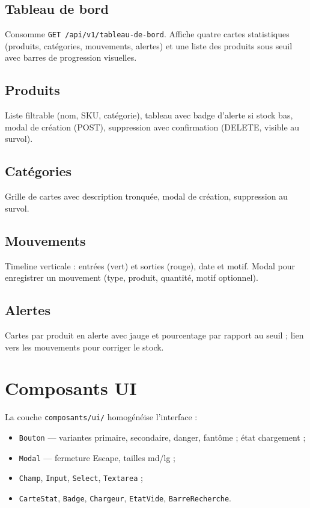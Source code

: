 \subsection{Tableau de bord}

Consomme \texttt{GET /api/v1/tableau-de-bord}. Affiche quatre cartes statistiques (produits, catégories, mouvements, alertes) et une liste des produits sous seuil avec barres de progression visuelles.

\subsection{Produits}

Liste filtrable (nom, SKU, catégorie), tableau avec badge d'alerte si stock bas, modal de création (POST), suppression avec confirmation (DELETE, visible au survol).

\subsection{Catégories}

Grille de cartes avec description tronquée, modal de création, suppression au survol.

\subsection{Mouvements}

Timeline verticale : entrées (vert) et sorties (rouge), date et motif. Modal pour enregistrer un mouvement (type, produit, quantité, motif optionnel).

\subsection{Alertes}

Cartes par produit en alerte avec jauge et pourcentage par rapport au seuil ; lien vers les mouvements pour corriger le stock.

\section{Composants UI}

La couche \texttt{composants/ui/} homogénéise l'interface :
\begin{itemize}
  \item \texttt{Bouton} — variantes primaire, secondaire, danger, fantôme ; état chargement ;
  \item \texttt{Modal} — fermeture Escape, tailles md/lg ;
  \item \texttt{Champ}, \texttt{Input}, \texttt{Select}, \texttt{Textarea} ;
  \item \texttt{CarteStat}, \texttt{Badge}, \texttt{Chargeur}, \texttt{EtatVide}, \texttt{BarreRecherche}.
\end{itemize}

